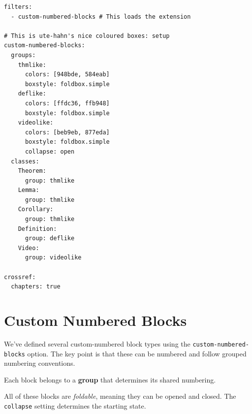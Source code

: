\documentclass[
  a4paper,
  DIV=11,
  numbers=noendperiod,
  oneside]{scrreport}
\begin{document}
\begin{verbatim}
filters:
  - custom-numbered-blocks # This loads the extension

# This is ute-hahn's nice coloured boxes: setup
custom-numbered-blocks:
  groups:
    thmlike:
      colors: [948bde, 584eab]
      boxstyle: foldbox.simple
    deflike:
      colors: [ffdc36, ffb948]
      boxstyle: foldbox.simple
    videolike:
      colors: [beb9eb, 877eda]
      boxstyle: foldbox.simple
      collapse: open
  classes:
    Theorem:
      group: thmlike
    Lemma:
      group: thmlike
    Corollary:
      group: thmlike
    Definition:
      group: deflike
    Video:
      group: videolike
      
crossref:
  chapters: true
\end{verbatim}

\section{Custom Numbered Blocks}\label{custom-numbered-blocks}

We've defined several custom-numbered block types using the
\texttt{custom-numbered-blocks} option. The key point is that these can
be numbered and follow grouped numbering conventions.

Each block belongs to a \textbf{group} that determines its shared
numbering.

All of these blocks are \emph{foldable}, meaning they can be opened and
closed. The \texttt{collapse} setting determines the starting state.
\end{document}
